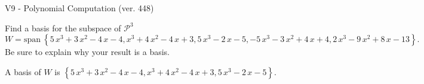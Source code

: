 \begin{exercise}
  \begin{exerciseTitle}V9 - Polynomial Computation (ver. 448)\end{exerciseTitle}
  \begin{exerciseStatement}
    Find a basis for the subspace of \(\mathcal{P}^3\) 
\[W=\mathrm{span}\ \left\{5 \, x^{3} + 3 \, x^{2} - 4 \, x - 4 , x^{3} + 4 \, x^{2} - 4 \, x + 3 , 5 \, x^{3} - 2 \, x - 5 , -5 \, x^{3} - 3 \, x^{2} + 4 \, x + 4 , 2 \, x^{3} - 9 \, x^{2} + 8 \, x - 13\right\}.\]
 Be sure to explain why your result is a basis.


  \end{exerciseStatement}
  \begin{exerciseAnswer}
   A basis of \(W\) is  \(\left\{5 \, x^{3} + 3 \, x^{2} - 4 \, x - 4 , x^{3} + 4 \, x^{2} - 4 \, x + 3 , 5 \, x^{3} - 2 \, x - 5\right\}\).
  


  \end{exerciseAnswer}
\end{exercise}